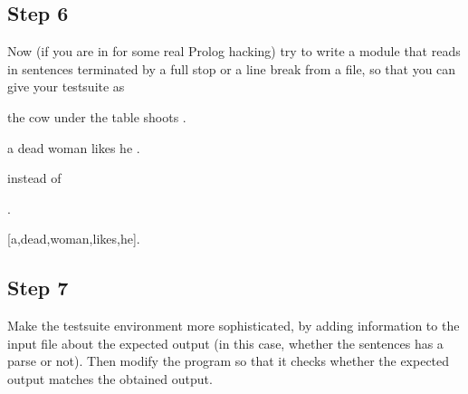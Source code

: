 \subsection*{Step 6}\label{L12.PRAXIS.STEP6}

Now (if you are in for some real Prolog hacking) try to write a module
that reads in sentences terminated by a full stop or a line break from
a file, so that you can give your testsuite as
\begin{LPNcodedisplay}
the cow under the table shoots .

a dead woman likes he .
\end{LPNcodedisplay}

instead of
\begin{LPNcodedisplay}
.

[a,dead,woman,likes,he].
\end{LPNcodedisplay}


\subsection*{Step 7}\label{L12.PRAXIS.STEP7}

Make the testsuite environment more sophisticated, by adding
information to the input file about the expected output (in this case,
whether the sentences has a parse or not). Then modify the program so
that it checks whether the expected output matches the obtained
output.
